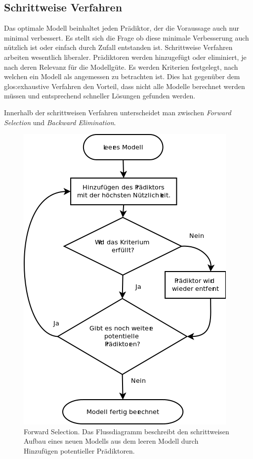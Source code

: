 \subsection{Schrittweise Verfahren} 
Das optimale Modell beinhaltet jeden Prädiktor, der die Voraussage auch nur minimal verbessert. 
Es stellt sich die Frage ob diese minimale Verbesserung auch nützlich ist oder einfach durch Zufall entstanden ist. 
Schrittweise Verfahren arbeiten wesentlich liberaler.  Prädiktoren werden hinzugefügt oder eliminiert, je nach deren Relevanz für die Modellgüte. 
Es werden Kriterien festgelegt, nach welchen ein Modell als angemessen zu betrachten ist. 
Dies hat gegenüber dem \gls{glos:exhaustive Verfahren} den Vorteil, dass nicht alle Modelle berechnet werden müssen und entsprechend schneller Lösungen gefunden werden.

Innerhalb der schrittweisen Verfahren unterscheidet man zwischen \textit{Forward Selection} und \textit{Backward Elimination}. 
\begin{figure}[H]
	\centering
	\includegraphics[height=0.5\textheight]{forward_stepwise.png}
	\caption{Forward Selection. Das Flussdiagramm beschreibt den schrittweisen Aufbau eines neuen Modells aus dem leeren Modell durch Hinzufügen potentieller Prädiktoren.}
	\label{fig:forward_stepwise}
\end{figure}
